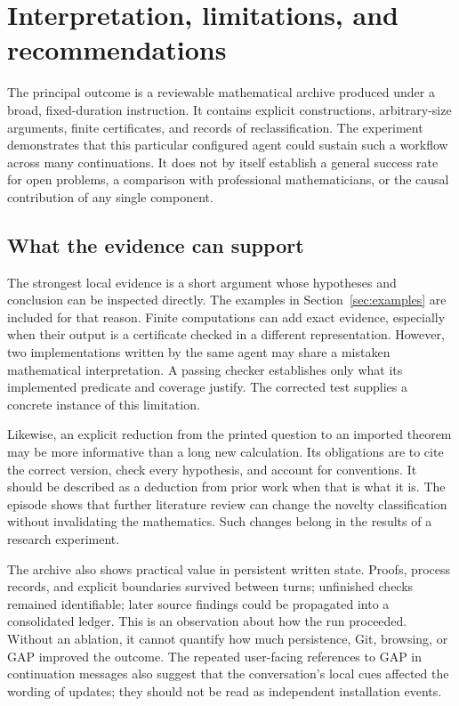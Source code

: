 \section{Interpretation, limitations, and recommendations}
\label{sec:discussion}

The principal outcome is a reviewable mathematical archive produced
under a broad, fixed-duration instruction. It contains explicit
constructions, arbitrary-size arguments, finite certificates, and
records of reclassification. The experiment demonstrates that this
particular configured agent could sustain such a workflow across many
continuations. It does not by itself establish a general success rate
for open problems, a comparison with professional mathematicians, or
the causal contribution of any single component.

\subsection{What the evidence can support}

The strongest local evidence is a short argument whose hypotheses and
conclusion can be inspected directly. The examples in
Section~\ref{sec:examples} are included for that reason. Finite
computations can add exact evidence, especially when their output is a
certificate checked in a different representation. However, two
implementations written by the same agent may share a mistaken
mathematical interpretation. A passing checker establishes only what
its implemented predicate and coverage justify. The corrected
 test supplies a concrete instance of this limitation.

Likewise, an explicit reduction from the printed question to an
imported theorem may be more informative than a long new calculation.
Its obligations are to cite the correct version, check every
hypothesis, and account for conventions. It should be described as a
deduction from prior work when that is what it is. The 
episode shows that further literature review can change the novelty
classification without invalidating the mathematics. Such changes
belong in the results of a research experiment.

The archive also shows practical value in persistent written state.
Proofs, process records, and explicit boundaries survived between
turns; unfinished checks remained identifiable; later source findings
could be propagated into a consolidated ledger. This is an observation
about how the run proceeded. Without an ablation, it cannot quantify
how much persistence, Git, browsing, or GAP improved the outcome.
The repeated user-facing references to GAP in continuation messages
also suggest that the conversation's local cues affected the wording
of updates; they should not be read as independent installation events.

